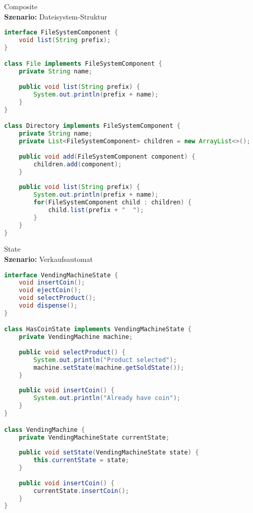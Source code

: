 \begin{example}{Composite}\\
\textbf{Szenario:} Dateisystem-Struktur
\begin{lstlisting}[language=Java, style=base]
interface FileSystemComponent {
    void list(String prefix);
}

class File implements FileSystemComponent {
    private String name;
    
    public void list(String prefix) {
        System.out.println(prefix + name);
    }
}

class Directory implements FileSystemComponent {
    private String name;
    private List<FileSystemComponent> children = new ArrayList<>();
    
    public void add(FileSystemComponent component) {
        children.add(component);
    }
    
    public void list(String prefix) {
        System.out.println(prefix + name);
        for(FileSystemComponent child : children) {
            child.list(prefix + "  ");
        }
    }
}
\end{lstlisting}
\end{example}

\begin{example}{State}\\
\textbf{Szenario:} Verkaufsautomat
\begin{lstlisting}[language=Java, style=base]
interface VendingMachineState {
    void insertCoin();
    void ejectCoin();
    void selectProduct();
    void dispense();
}

class HasCoinState implements VendingMachineState {
    private VendingMachine machine;
    
    public void selectProduct() {
        System.out.println("Product selected");
        machine.setState(machine.getSoldState());
    }
    
    public void insertCoin() {
        System.out.println("Already have coin");
    }
}

class VendingMachine {
    private VendingMachineState currentState;
    
    public void setState(VendingMachineState state) {
        this.currentState = state;
    }
    
    public void insertCoin() {
        currentState.insertCoin();
    }
}
\end{lstlisting}
\end{example}

